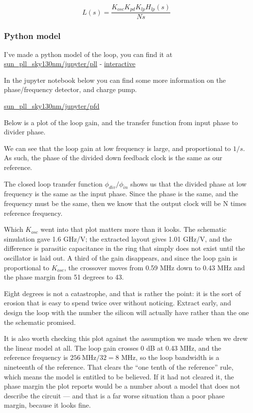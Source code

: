 \[ L(s) = \frac{ K_{osc} K_{pd} K_{lp} H_{lp}(s) }{N s} \]

\subsubsection{Python model}\label{python-model}

I've made a python model of the loop, you can find it at
\href{https://github.com/wulffern/sun_pll_sky130nm/blob/main/jupyter/pll.ipynb}{sun\_pll\_sky130nm/jupyter/pll}
-
\href{https://wulffern.github.io/aic2026/assets/examples/pll.html}{interactive}

In the jupyter notebook below you can find some more information on the
phase/frequency detector, and charge pump.

\href{https://github.com/wulffern/sun_pll_sky130nm/blob/main/jupyter/pfd.ipynb}{sun\_pll\_sky130nm/jupyter/pfd}

Below is a plot of the loop gain, and the transfer function from input
phase to divider phase.

We can see that the loop gain at low frequency is large, and
proportional to \(1/s\). As such, the phase of the divided down feedback
clock is the same as our reference.

The closed loop transfer function \(\phi_{div}/\phi_{in}\) shows us that
the divided phase at low frequency is the same as the input phase. Since
the phase is the same, and the frequency must be the same, then we know
that the output clock will be N times reference frequency.

Which \(K_{osc}\) went into that plot matters more than it looks. The
schematic simulation gave 1.6 GHz/V; the extracted layout gives 1.01
GHz/V, and the difference is parasitic capacitance in the ring that
simply does not exist until the oscillator is laid out. A third of the
gain disappears, and since the loop gain is proportional to \(K_{osc}\),
the crossover moves from 0.59 MHz down to 0.43 MHz and the phase margin
from 51 degrees to 43.

Eight degrees is not a catastrophe, and that is rather the point: it is
the sort of erosion that is easy to spend twice over without noticing.
Extract early, and design the loop with the number the silicon will
actually have rather than the one the schematic promised.

It is also worth checking this plot against the assumption we made when
we drew the linear model at all. The loop gain crosses 0 dB at 0.43 MHz,
and the reference frequency is \(256\ \text{MHz}/32 = 8\) MHz, so the
loop bandwidth is a nineteenth of the reference. That clears the ``one
tenth of the reference'' rule, which means the model is entitled to be
believed. If it had not cleared it, the phase margin the plot reports
would be a number about a model that does not describe the circuit ---
and that is a far worse situation than a poor phase margin, because it
looks fine.



